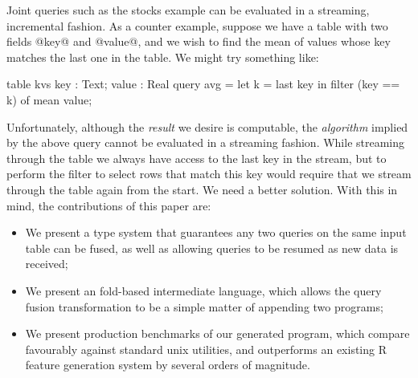 Joint queries such as the stocks example can be evaluated in a streaming, incremental fashion. As a counter example, suppose we have a table with two fields @key@ and @value@, and we wish to find the mean of values whose key matches the last one in the table. We might try something like:
\begin{code}
  table kvs { key : Text; value : Real }
  query avg = let k = last key
              in  filter (key == k) of mean value;
\end{code}
Unfortunately, although the \emph{result} we desire is computable, the \emph{algorithm} implied by the above query cannot be evaluated in a streaming fashion. While streaming through the table we always have access to the last key in the stream, but to perform the filter to select rows that match this key would require that we stream through the table again from the start. We need a better solution. With this in mind, the contributions of this paper are:
\begin{itemize}
\item
We present a type system that guarantees any two queries on the same input table can be fused, as well as allowing queries to be resumed as new data is received;

\item
We present an fold-based intermediate language, which allows the query fusion transformation to be a simple matter of appending two programs;

\item
We present production benchmarks of our generated program, which compare favourably against standard unix utilities, and outperforms an existing R feature generation system by several orders of magnitude.
\end{itemize}




